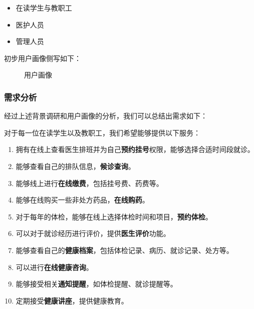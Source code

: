 \documentclass{article}
\begin{document}
\begin{itemize}[itemsep=0.01em]
    \item 在读学生与教职工
    \item 医护人员
    \item 管理人员
\end{itemize}

初步用户画像侧写如下：

\begin{figure}[h]
    \centering
    \caption{用户画像}
\end{figure}

\subsubsection{需求分析}

经过上述背景调研和用户画像的分析，我们可以总结出需求如下：
\vspace{0.5cm}

对于每一位在读学生以及教职工，我们希望能够提供以下服务：
\begin{enumerate}[itemsep=0.01em]
    \item 拥有在线上查看医生排班并为自己\textbf{预约挂号}权限，能够选择合适时间段就诊。
    \item 能够查看自己的排队信息，\textbf{候诊查询}。
    \item 能够线上进行\textbf{在线缴费}，包括挂号费、药费等。
    \item 能够在线购买一些非处方药品，\textbf{在线购药}。
    \item 对于每年的体检，能够在线上选择体检时间和项目，\textbf{预约体检}。
    \item 可以对于就诊经历进行评价，提供\textbf{医生评价}功能。
    \item 能够查看自己的\textbf{健康档案}，包括体检记录、病历、就诊记录、处方等。
    \item 可以进行\textbf{在线健康咨询}。
    \item 能够接受相关\textbf{通知提醒}，如体检提醒、就诊提醒等。
    \item 定期接受\textbf{健康讲座}，提供健康教育。
\end{enumerate}
\end{document}
